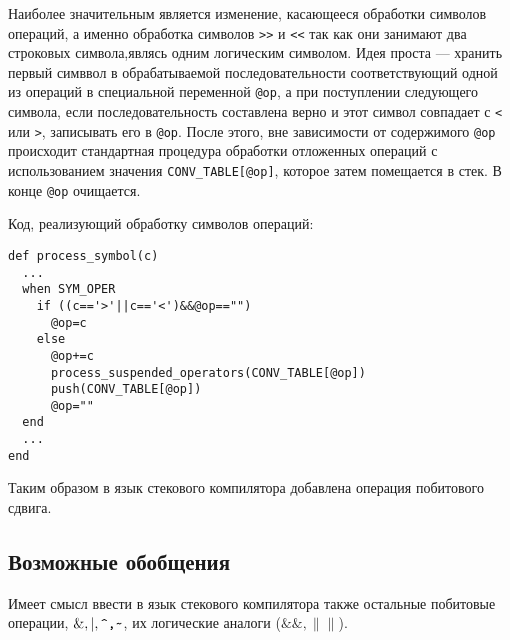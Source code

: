 Наиболее значительным является изменение, касающееся обработки символов операций,
а именно обработка символов \verb|>>| и \verb|<<| так как они занимают два
строковых символа,являсь одним логическим символом. Идея проста --- хранить
первый симввол в обрабатываемой последовательности соответствующий одной из
операций в специальной переменной \verb|@op|, а при поступлении следующего
символа, если последовательность составлена верно и этот символ совпадает с
\verb|<| или \verb|>|, записывать его в \verb|@op|. После этого, вне зависимости
от содержимого \verb|@op| происходит стандартная процедура обработки отложенных
операций с использованием значения \verb|CONV_TABLE[@op]|, которое затем
помещается в стек. В конце \verb|@op| очищается.

\newpage

Код, реализующий обработку символов операций:
\begin{lstlisting}
def process_symbol(c)
  ...
  when SYM_OPER
    if ((c=='>'||c=='<')&&@op=="")
      @op=c
    else
      @op+=c
      process_suspended_operators(CONV_TABLE[@op])
      push(CONV_TABLE[@op])
      @op=""
  end
  ...
end
\end{lstlisting}

Таким образом в язык стекового компилятора добавлена операция побитового сдвига.
\subsection{Возможные обобщения}
Имеет смысл ввести в язык стекового компилятора также остальные побитовые операции,
$\&,|,\verb|^,~|$, их логические аналоги ($\&\&,\|\|$).
